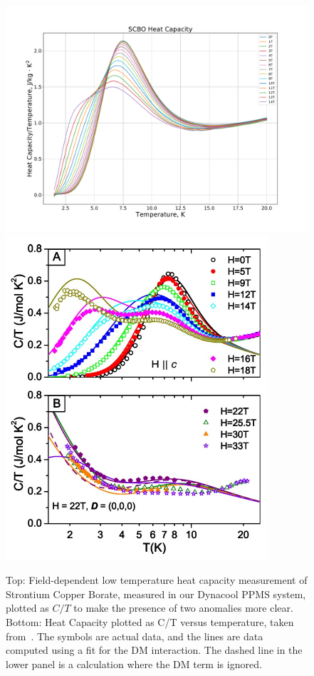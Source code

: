 \documentclass{thesis-umich}
\begin{document}
\begin{figure}
	\centering
	\caption[Low Temperature Heat Capacity of SCBO]{Top: Field-dependent low temperature heat capacity measurement of Strontium Copper Borate, measured in our Dynacool PPMS system, plotted as $C/T$ to make the presence of two anomalies more clear. Bottom: Heat Capacity plotted as C/T versus temperature, taken from~\cite{Jorge2005}. The symbols are actual data, and the lines are data computed using a fit for the DM interaction. The dashed line in the lower panel is a calculation where the DM term is ignored.}
	\label{fig:scbo_hc}
	\centering
	\includegraphics[width=0.85\columnwidth]{figures/SCBO_total_HC_over_T.pdf}
	\includegraphics[width=0.5\columnwidth]{figures/SCBO_HC_Jorge_2005.pdf}
\end{figure}
\end{document}
